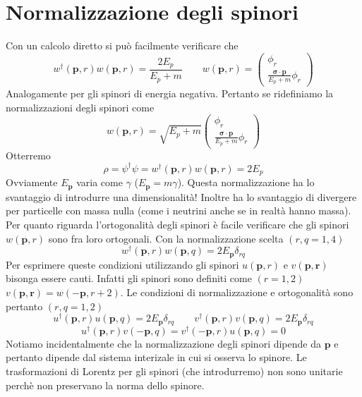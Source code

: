 \section{Normalizzazione degli spinori}
Con un calcolo diretto si può facilmente verificare che
$$
w^\dagger(\mathbf{p}, r) w(\mathbf{p}, r) = \frac{2E_p}{E_p + m} \qquad w(\mathbf{p}, r) = \begin{pmatrix} \phi_r \\ \frac{\boldsymbol{\sigma} \cdot \mathbf{p}}{E_p + m} \phi_r \end{pmatrix}
$$
Analogamente per gli spinori di energia negativa. Pertanto se ridefiniamo la normalizzazioni degli spinori come
$$
w(\mathbf{p}, r) = \sqrt{E_p + m} \begin{pmatrix} \phi_r \\ \frac{\boldsymbol{\sigma} \cdot \mathbf{p}}{E_p + m} \phi_r \end{pmatrix}
$$
Otterremo
$$
\rho = \psi^\dagger \psi = w^\dagger(\mathbf{p}, r) w(\mathbf{p}, r) = 2E_p
$$
Ovviamente $E_\mathbf{p}$ varia come $\gamma$ ($E_\mathbf{p}=m\gamma$). Questa normalizzazione ha lo svantaggio di introdurre una dimensionalità! Inoltre ha lo svantaggio di divergere per particelle con massa nulla (come i neutrini anche se in realtà hanno massa). Per quanto riguarda l'ortogonalità degli spinori è facile verificare che gli spinori $w(\mathbf{p},r)$ sono fra loro ortogonali. Con la normalizzazione scelta $(r,q=1,4)$
$$
w^\dagger(\mathbf{p}, r) w(\mathbf{p}, q) = 2E_\mathbf{p} \delta_{rq}
$$
Per esprimere queste condizioni utilizzando gli spinori $u(\mathbf{p},r)$ e $v(\mathbf{p,r})$ bisonga essere cauti. Infatti gli spinori sono definiti come $(r=1,2)$ $v(\mathbf{p,r})=w(-\mathbf{p},r+2)$. Le condizioni di normalizzazione e ortogonalità sono pertanto $(r,q=1,2)$
$$
u^\dagger(\mathbf{p}, r) u(\mathbf{p}, q) = 2E_\mathbf{p} \delta_{rq} \qquad v^\dagger(\mathbf{p}, r) v(\mathbf{p}, q) = 2E_\mathbf{p} \delta_{rq}
$$
$$
u^\dagger(\mathbf{p}, r) v(-\mathbf{p}, q) = v^\dagger(-\mathbf{p}, r) u(\mathbf{p}, q) = 0
$$
Notiamo incidentalmente che la normalizzazione degli spinori dipende da $\mathbf{p}$ e pertanto dipende dal sistema interizale in cui si osserva lo spinore. Le trasformazioni di Lorentz per gli spinori (che introdurremo) non sono unitarie perchè non preservano la norma dello spinore.
